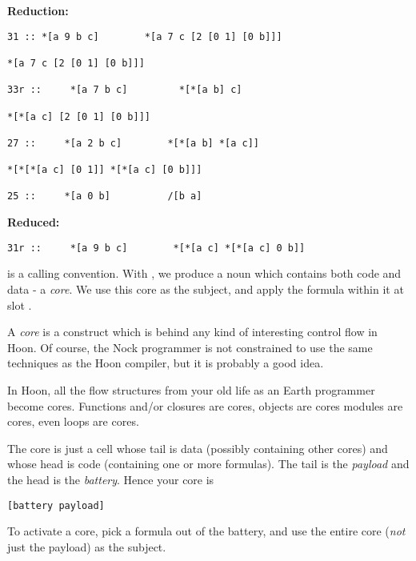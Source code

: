 \textbf{ Reduction:}

\begin{framed_shaded}
\begin{Verbatim}[fontsize=\relsize{-2.5},fontseries=b,commandchars=\\\{\}]
31 :: *[a 9 b c]        *[a 7 c [2 [0 1] [0 b]]]

*[a 7 c [2 [0 1] [0 b]]]

33r ::     *[a 7 b c]         *[*[a b] c]

*[*[a c] [2 [0 1] [0 b]]]

27 ::     *[a 2 b c]        *[*[a b] *[a c]]

*[*[*[a c] [0 1]] *[*[a c] [0 b]]]

25 ::     *[a 0 b]          /[b a]
\end{Verbatim}
\end{framed_shaded}
\textbf{ Reduced:}    

\begin{framed_shaded}
\begin{Verbatim}[fontsize=\relsize{-2.5},fontseries=b,commandchars=\\\{\}]
31r ::     *[a 9 b c]        *[*[a c] *[*[a c] 0 b]] 
\end{Verbatim}
\end{framed_shaded}

 is a calling convention.  With , we produce a noun which contains both
code and data - a \emph{core}.  We use this core as the subject, and apply the
formula within it at slot .

A \emph{core} is a construct which is behind any kind of interesting control flow in
Hoon.  Of course, the Nock programmer is not constrained to use the same
techniques as the Hoon compiler, but it is probably a good idea. 

In Hoon, all the flow structures from your old life as an Earth programmer
become cores.  Functions and/or closures are cores, objects are cores modules
are cores, even loops are cores.

The core is just a cell whose tail is data (possibly containing other cores)
and whose head is code (containing one or more formulas).  The tail is the
\emph{payload} and the head is the \emph{battery}.  Hence your core is

\begin{framed_shaded}
\begin{Verbatim}[fontsize=\relsize{-2.5},fontseries=b,commandchars=\\\{\}]
[battery payload]
\end{Verbatim}
\end{framed_shaded}
To activate a core, pick a formula out of the battery, and use the entire core
(\emph{not} just the payload) as the subject.  

